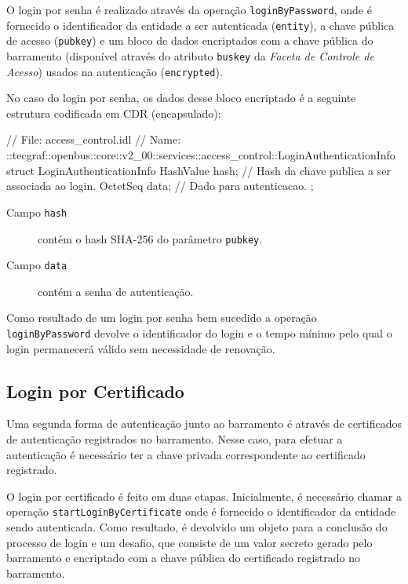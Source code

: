 \documentclass[]{article}
\newcommand{\term}[1]{\textit{#1}}
\newcommand{\code}[1]{\texttt{#1}}
\begin{document}
O login por senha é realizado através da operação \code{loginByPassword}, onde é fornecido o identificador da entidade a ser autenticada (\code{entity}), a chave pública de acesso (\code{pubkey}) e um bloco de dados encriptados com a chave pública do barramento (disponível através do atributo \code{buskey} da \term{Faceta de Controle de Acesso}) usados na autenticação (\code{encrypted}).

No caso do login por senha, os dados desse bloco encriptado é a seguinte estrutura codificada em CDR (encapsulado):

\begin{samplecode}[language={[CORBA]idl}]
// File: access_control.idl
// Name: ::tecgraf::openbus::core::v2_00::services::access_control::LoginAuthenticationInfo
struct LoginAuthenticationInfo {
	HashValue hash; // Hash da chave publica a ser associada ao login.
	OctetSeq data;  // Dado para autenticacao.
};
\end{samplecode}

\begin{description}
	\item[Campo \code{hash}] contém o hash SHA-256 do parâmetro \code{pubkey}.
	\item[Campo \code{data}] contém a senha de autenticação.
\end{description}

Como resultado de um login por senha bem sucedido a operação \code{loginByPassword} devolve o identificador do login e o tempo mínimo pelo qual o login permanecerá válido sem necessidade de renovação.


\subsection{Login por Certificado} %
\label{sub:login_por_certificado}

Uma segunda forma de autenticação junto ao barramento é através de certificados de autenticação registrados no barramento.
Nesse caso, para efetuar a autenticação é necessário ter a chave privada correspondente ao certificado registrado.

O login por certificado é feito em duas etapas.
Inicialmente, é necessário chamar a operação \code{startLoginByCertificate} onde é fornecido o identificador da entidade sendo autenticada.
Como resultado, é devolvido um objeto para a conclusão do processo de login e um desafio, que consiste de um valor secreto gerado pelo barramento e encriptado com a chave pública do certificado registrado no barramento.
\end{document}
